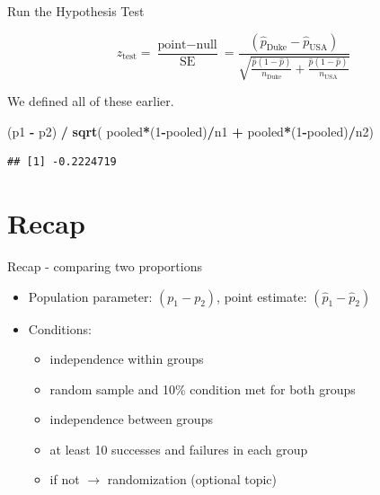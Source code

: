 \documentclass[
  ignorenonframetext,
]{beamer}
\newenvironment{Shaded}{\begin{snugshade}}{\end{snugshade}}
\newcommand{\DecValTok}[1]{\textcolor[rgb]{0.00,0.00,0.81}{#1}}
\newcommand{\KeywordTok}[1]{\textcolor[rgb]{0.13,0.29,0.53}{\textbf{#1}}}
\newcommand{\NormalTok}[1]{#1}
\newcommand{\OperatorTok}[1]{\textcolor[rgb]{0.81,0.36,0.00}{\textbf{#1}}}
\newcommand{\StringTok}[1]{\textcolor[rgb]{0.31,0.60,0.02}{#1}}
\providecommand{\tightlist}{%
  \setlength{\itemsep}{0pt}\setlength{\parskip}{0pt}}
\begin{document}
\begin{frame}[fragile]{Run the Hypothesis Test}
\protect\hypertarget{run-the-hypothesis-test-1}{}

\[
z_\text{test} = \frac{\text{point} - \text{null}}{\text{SE}} = \frac{(\hat{p}_\text{Duke} - \hat{p}_\text{USA})}{\sqrt{ \frac{ \hat{p} (1 - \hat{p})}{n_\text{Duke} } + \frac{ \hat{p} (1 -  \hat{p})}{n_\text{USA} } }}
\]

We defined all of these earlier.

\begin{Shaded}
\begin{Highlighting}[]
\NormalTok{(p1 }\OperatorTok{-}\StringTok{ }\NormalTok{p2) }\OperatorTok{/}\StringTok{ }\KeywordTok{sqrt}\NormalTok{( pooled}\OperatorTok{*}\NormalTok{(}\DecValTok{1}\OperatorTok{-}\NormalTok{pooled)}\OperatorTok{/}\NormalTok{n1 }\OperatorTok{+}\StringTok{ }\NormalTok{pooled}\OperatorTok{*}\NormalTok{(}\DecValTok{1}\OperatorTok{-}\NormalTok{pooled)}\OperatorTok{/}\NormalTok{n2)}
\end{Highlighting}
\end{Shaded}

\begin{verbatim}
## [1] -0.2224719
\end{verbatim}

\end{frame}

\hypertarget{recap}{%
\section{Recap}\label{recap}}

\begin{frame}{Recap - comparing two proportions}
\protect\hypertarget{recap---comparing-two-proportions}{}

\begin{itemize}
\tightlist
\item
  Population parameter: \((p_1 - p_2)\), point estimate:
  \((\hat{p}_1 - \hat{p}_2)\)
\item
  Conditions:

  \begin{itemize}
  \tightlist
  \item
    independence within groups
  \item
    random sample and 10\% condition met for both groups
  \item
    independence between groups
  \item
    at least 10 successes and failures in each group
  \item
    if not \(\rightarrow\) randomization (optional topic)
  \end{itemize}
\end{itemize}

\end{frame}
\end{document}
